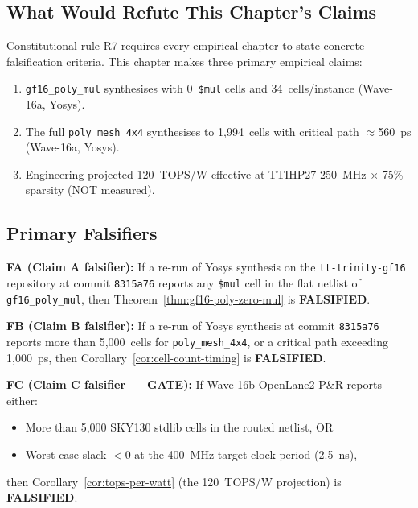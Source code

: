 \subsection{What Would Refute This Chapter's Claims}

Constitutional rule R7 requires every empirical chapter to state
concrete falsification criteria.
This chapter makes three primary empirical claims:

\begin{enumerate}
  \item[\textbf{Claim A}] \texttt{gf16\_poly\_mul} synthesises with
        0~\texttt{\$mul} cells and 34~cells/instance (Wave-16a, Yosys).
  \item[\textbf{Claim B}] The full \texttt{poly\_mesh\_4x4} synthesises
        to 1,994~cells with critical path $\approx$560~ps (Wave-16a, Yosys).
  \item[\textbf{Claim C}] Engineering-projected 120~TOPS/W effective at
        TTIHP27 250~MHz $\times$ 75\% sparsity (NOT measured).
\end{enumerate}

\subsection{Primary Falsifiers}

\begin{tcolorbox}[colback=red!3,colframe=red!40!black,
  title={\textbf{Falsification Criteria (R7) --- Glava 35}}]
\textbf{FA (Claim A falsifier):}
If a re-run of Yosys synthesis on the \texttt{tt-trinity-gf16} repository
at commit \texttt{8315a76} reports any \texttt{\$mul} cell
in the flat netlist of \texttt{gf16\_poly\_mul},
then Theorem~\ref{thm:gf16-poly-zero-mul} is \textbf{FALSIFIED}.

\textbf{FB (Claim B falsifier):}
If a re-run of Yosys synthesis at commit \texttt{8315a76} reports
more than 5,000~cells for \texttt{poly\_mesh\_4x4},
or a critical path exceeding 1,000~ps,
then Corollary~\ref{cor:cell-count-timing} is \textbf{FALSIFIED}.

\textbf{FC (Claim C falsifier --- GATE):}
If Wave-16b OpenLane2 P\&R reports either:
\begin{itemize}
  \item More than 5,000 SKY130 stdlib cells in the routed netlist, OR
  \item Worst-case slack $< 0$ at the 400~MHz target clock period (2.5~ns),
\end{itemize}
then Corollary~\ref{cor:tops-per-watt} (the 120~TOPS/W projection)
is \textbf{FALSIFIED}.
\end{tcolorbox}

